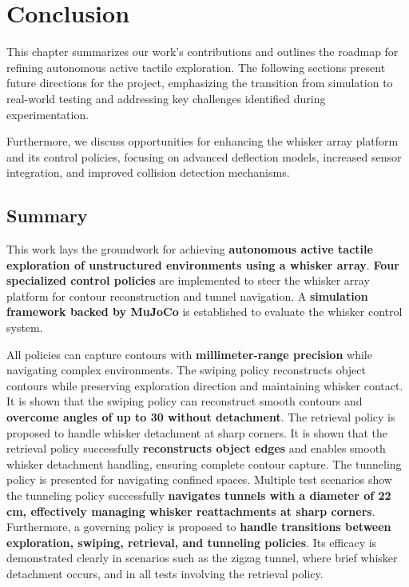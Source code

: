

\chapter{Conclusion}

This chapter summarizes our work's contributions and outlines the roadmap for refining autonomous active tactile exploration.
The following sections present future directions for the project, emphasizing the transition from simulation to real-world testing and addressing key challenges identified during experimentation.

Furthermore, we discuss opportunities for enhancing the whisker array platform and its control policies, focusing on advanced deflection models, increased sensor integration, and improved collision detection mechanisms.


\section{Summary}

This work lays the groundwork for achieving \textbf{autonomous active tactile exploration of unstructured environments using a whisker array}.
\textbf{Four specialized control policies} are implemented to steer the whisker array platform for contour reconstruction and tunnel navigation.
A \textbf{simulation framework backed by MuJoCo} is established to evaluate the whisker control system.

All policies can capture contours with \textbf{millimeter-range precision} while navigating complex environments.
The swiping policy reconstructs object contours while preserving exploration direction and maintaining whisker contact.
It is shown that the swiping policy can reconstruct smooth contours and \textbf{overcome angles of up to 30\degree{} without detachment}.
The retrieval policy is proposed to handle whisker detachment at sharp corners.
It is shown that the retrieval policy successfully \textbf{reconstructs object edges} and enables smooth whisker detachment handling, ensuring complete contour capture.
The tunneling policy is presented for navigating confined spaces.
Multiple test scenarios show the tunneling policy successfully \textbf{navigates tunnels with a diameter of 22\,cm, effectively managing whisker reattachments at sharp corners}.
Furthermore, a governing policy is proposed to \textbf{handle transitions between exploration, swiping, retrieval, and tunneling policies}.
Its efficacy is demonstrated clearly in scenarios such as the zigzag tunnel, where brief whisker detachment occurs, and in all tests involving the retrieval policy.

